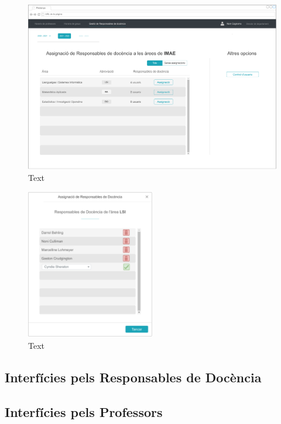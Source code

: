 \documentclass[a4paper,12pt]{ThesisStyle}
\begin{document}
\begin{figure}[H]
	\centering
	\includegraphics[width=\textwidth]{assets/interfaces/directors/gestResp/main.pdf}
	\caption{\label{img:gestResp_main}Text}
\end{figure}

\begin{figure}[H]
	\centering
	\includegraphics[width=0.5\textwidth]{assets/interfaces/directors/gestResp/assignDialog.pdf}
	\caption{\label{img:gestResp_assignDialog}Text}
\end{figure}

\subsection{Interfícies pels Responsables de Docència}
\label{subsec:interficies_responsables}


\subsection{Interfícies pels Professors}
\label{subsec:interficies_professors}
\end{document}
